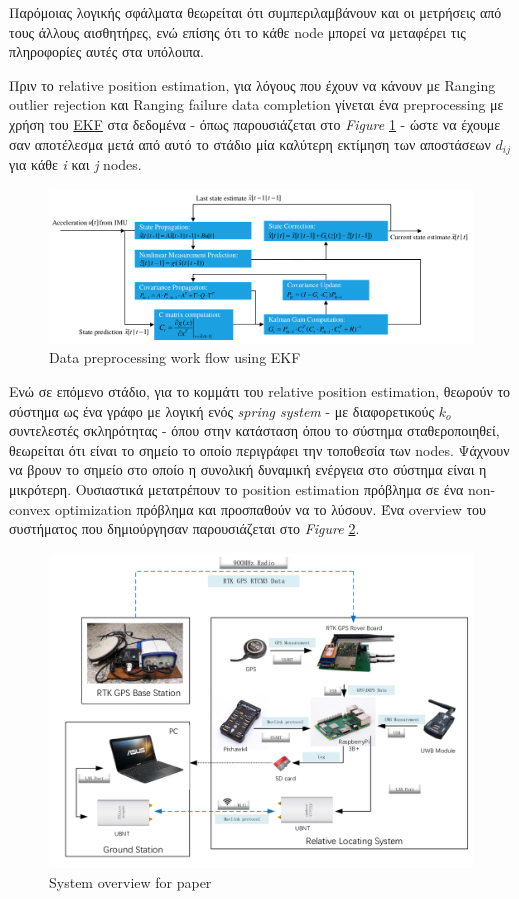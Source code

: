Παρόμοιας λογικής σφάλματα θεωρείται ότι συμπεριλαμβάνουν και οι μετρήσεις από
τους άλλους αισθητήρες, ενώ επίσης ότι το κάθε node μπορεί να μεταφέρει τις πληροφορίες 
αυτές στα υπόλοιπα.

Πριν το relative position estimation, για λόγους που έχουν να κάνουν με 
Ranging outlier rejection και Ranging failure data completion γίνεται ένα 
preprocessing με χρήση του \hyperref[abbr:EKF]{EKF} στα δεδομένα - όπως 
παρουσιάζεται στο \emph{Figure} \ref{fig:Data-preprocessing-work-flow-using-EKF} -
ώστε να έχουμε σαν αποτέλεσμα μετά από αυτό το στάδιο μία καλύτερη εκτίμηση των αποστάσεων $d_{ij}$ 
για κάθε \emph{i} και \emph{j} nodes. 

\begin{figure} [H]
	\centering
	\includegraphics[width=\linewidth]{Images/Related-Work/Data-preprocessing-work-flow-using-EKF.png}
	\decoRule
	\caption[Data preprocessing work flow using EKF]{Data preprocessing work flow using EKF\cite{uwb-imu-gps1}}
	\label{fig:Data-preprocessing-work-flow-using-EKF}
\end{figure}

Ενώ σε επόμενο στάδιο, για το κομμάτι του relative position estimation, θεωρούν το σύστημα ως ένα γράφο 
με λογική ενός \emph{spring system} - με διαφορετικούς $k_o$ συ\-ντε\-λεστές σκληρότητας - όπου στην κατάσταση 
όπου το σύστημα σταθεροποιηθεί, θεωρείται ότι είναι το σημείο
το οποίο περιγράφει την τοποθεσία των nodes. Ψάχνουν να βρουν το σημείο στο οποίο η συνολική δυναμική ενέργεια 
στο σύστημα είναι η μικρότερη. Ουσιαστικά μετατρέπουν το position estimation πρόβλημα σε ένα 
non-convex optimization πρόβλημα και προσπαθούν να το λύσουν. Ένα overview του συστήματος που δημιούργησαν 
παρουσιάζεται στο \emph{Figure} \ref{fig:paper1-overview}.

\begin{figure} [H]
	\centering
	\includegraphics[width=0.69
	\linewidth]{Images/Related-Work/UAV-swarm-system-diagram.png}
	\decoRule
	\caption[System overview]{System overview for paper \cite{uwb-imu-gps1}}
	\label{fig:paper1-overview}
\end{figure}







